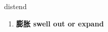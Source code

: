 
\begin{frame}
{\huge distend}
\begin{center}
\begin{enumerate}\Large
  \item \textbf{膨胀 swell out or expand}
\end{enumerate}
\end{center}
\end{frame}
